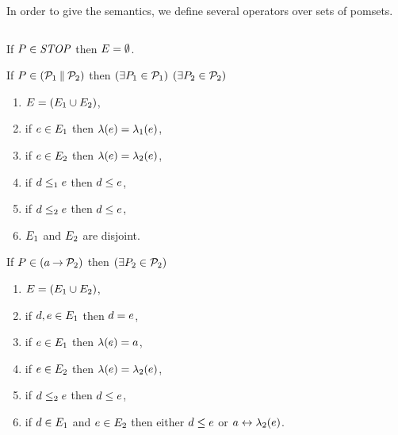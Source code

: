 In order to give the semantics, we define several operators over sets of
pomsets.

\begin{definition} $\phantom{\;}$\par
  \label{tab:pomsets}

  \noindent
  If $\aPS\SB0\in\sSTOP$ then $\aEvs\SB0 = \emptyset$.

  \noindent
  If $\aPS\SB0 \in (\aPSS_1\sPAR\aPSS_2)$ then  
  $(\exists\aPS_1\in\aPSS_1)$ $(\exists\aPS_2\in\aPSS_2)$
  \begin{enumerate}
  \item \label{par-E}
    $\aEvs\SB0 = (\aEvs_1\cup\aEvs_2)$,
  \item \label{par-lambda1}
    if $\aEv\in\aEvs_1$ then $\labeling\SB0(\aEv) = \labeling_1(\aEv)$, 
  \item \label{par-lambda2}
    if $\aEv\in\aEvs_2$ then $\labeling\SB0(\aEv) = \labeling_2(\aEv)$,
  \item \label{par-le1}
    if $\bEv\le_1\aEv$ then $\bEv\le\SB0\aEv$, 
  \item \label{par-le2}
    if $\bEv\le_2\aEv$ then $\bEv\le\SB0\aEv$, 
    \setcounter{pomsetParCount}{\value{enumi}}
  \item \label{par-disjoint}
    $\aEvs_1$ and $\aEvs_2$ are disjoint.
    \setcounter{pomsetParDisjointCount}{\value{enumi}}
  \end{enumerate}

  \noindent
  If $\aPS\SB0 \in (\aAct\sPREFIX\aPSS_2)$ then
  $(\exists\aPS_2\in\aPSS_2)$
  \begin{enumerate}
  \item \label{pre-E}
    $\aEvs\SB0=(\aEvs_1 \cup \aEvs_2)$,
  \item \label{pre-unique}
    if $\bEv,\aEv\in\aEvs_1$ then $\bEv=\aEv$,
  \item \label{pre-lambda1}
    if $\aEv\in\aEvs_1$ then $\labelingAct\SB0(\aEv) = \aAct$,
  \item \label{pre-lambda2}
    if $\aEv\in\aEvs_2$ then $\labelingAct\SB0(\aEv) = \labelingAct_2(\aEv)$,
  \item \label{pre-le2}
    if $\bEv\le_2\aEv$ then $\bEv\le\SB0\aEv$, 
  \item
    \label{pre-reorder}
    if $\bEv\in\aEvs_1$ and $\aEv\in\aEvs_2$ then either $\bEv\leq\SB0\aEv$ or $a\reorder\labeling_2(\aEv)$.
    \setcounter{pomsetPrefixOrderCount}{\value{enumi}}
  \end{enumerate}
\end{definition}

